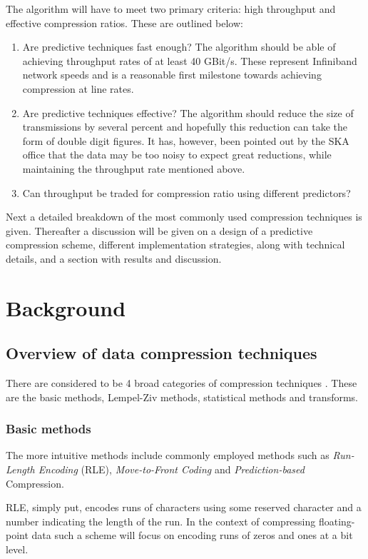 The algorithm will have to meet two primary criteria: high throughput and effective compression ratios. These are outlined below:
\begin{enumerate}
 \item Are predictive techniques fast enough? The algorithm should be able of achieving throughput rates of at least 40 GBit/s. These represent Infiniband network speeds 
 and is a reasonable first milestone towards achieving compression at line rates.
 \item Are predictive techniques effective? The algorithm should reduce the size of transmissions by several percent and hopefully this reduction can take the form of 
       double digit figures. It has, however, been pointed out by the SKA office that the data may be too noisy to expect great reductions, while maintaining the throughput 
       rate mentioned above.
 \item Can throughput be traded for compression ratio using different predictors?
\end{enumerate}

Next a detailed breakdown of the most commonly used compression techniques is given. Thereafter a discussion will be given on a design of a predictive compression scheme, 
different implementation strategies, along with technical details, and a section with results and discussion.
\section{Background}
\subsection{Overview of data compression techniques}
There are considered to be 4 broad categories of compression techniques \cite{salomon2004data}. These are the basic methods, Lempel-Ziv methods, statistical methods 
and transforms.
\subsubsection{Basic methods}
The more intuitive methods include commonly employed methods such as \textit{Run-Length Encoding} (RLE), \textit{Move-to-Front Coding} and \textit{Prediction-based} Compression. 

RLE, simply put, encodes runs of characters using some reserved character and a number indicating the length of the run. In the context of compressing floating-point data such a scheme will 
focus on encoding runs of zeros and ones at a bit level. 

